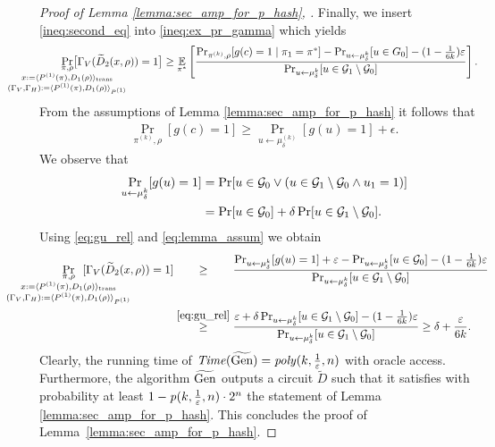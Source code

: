 \begin{proof}[Proof of Lemma \ref{lemma:sec_amp_for_p_hash}, \cite{holenstein2011general}]
Finally, we insert \eqref{ineq:second_eq} into \eqref{ineq:ex_pr_gamma} which yields
\begin{align*}
  \IndI
\underset{
  \mathclap{
  \substack{\pi, \rho \\ x := \langle P^{(1)}(\pi), D_1(\rho) \rangle_{\text{trans}}
    \\ (\Gamma_V, \Gamma_H) := \langle P^{(1)}(\pi), D_1 (\rho) \rangle_{P^{(1)}} }}}
{\Pr}\big[\Gamma_V(\widetilde{D}_2(x, \rho)) = 1\big]
&\geq \underset{\pi^*}{\mathbb{E}}\left[\frac{{\Pr}_{\pi^{(k)}, \rho}[g(c) = 1 \mid \pi_1 = \pi^*] -
{\Pr}_{u \leftarrow \mu_{\delta}^{k}}[u \in G_0] - (1 - \frac{1}{6k})\epsilon} {\Pr_{u \leftarrow \mu_{\delta}^{k}}[u \in \cG_1 \setminus \cG_0]}\right] \notag.
 \end{align*}
 From the assumptions of Lemma \ref{lemma:sec_amp_for_p_hash} it follows that
 \begin{align}
   \label{eq:lemma_assum}
   \Pr_{\pi^{(k)}, \rho} [g(c) = 1] \geq \Pr_{u \leftarrow \mu_{\delta}^{(k)}}[g(u) = 1] + \epsilon.
 \end{align}
We observe that
\begin{align}
  \label{eq:gu_rel}
\underset{u \leftarrow \mu_{\delta}^k}{\Pr}[g(u) = 1]
&= \Pr[u \in \mathcal{G}_0 \lor ( u \in \mathcal{G}_1 \setminus \mathcal{G}_0 \land u_1 = 1)] \notag\\
&= \Pr[u \in \mathcal{G}_0] + \delta \Pr[u \in \mathcal{G}_1 \setminus \mathcal{G}_0].
\end{align}
 Using \eqref{eq:gu_rel} and \eqref{eq:lemma_assum} we obtain
 \begin{align}
   \label{eq:proof_final}
   \IndI
\underset{
  \mathclap{
  \substack{\pi, \rho \\ x := \langle P^{(1)}(\pi), D_1(\rho) \rangle_{\text{trans}}
    \\ (\Gamma_V, \Gamma_H) := \langle P^{(1)}(\pi), D_1 (\rho) \rangle_{P^{(1)}} }}}
{\Pr}\mkern13mu[\Gamma_V(\widetilde{D}_2(x, \rho)) = 1]
 &\stackrel{\hphantom{\eqref{eq:gu_rel}}}{\geq} \frac{ {\Pr}_{u \leftarrow \mu_{\delta}^{k}}[g(u) = 1] + \epsilon -
 \Pr_{u \leftarrow \mu_{\delta}^{k}}[u \in \cG_0] - (1 - \frac{1}{6k})\epsilon} {\Pr_{u \leftarrow \mu_{\delta}^{k}}[u \in \cG_1 \setminus \cG_0]} \notag\\
 &\stackrel{\eqref{eq:gu_rel}}{\geq} \frac{\epsilon + \delta\Pr_{u \leftarrow \mu_{\delta}^{k}}[u \in \cG_1 \setminus \cG_0] - (1 - \frac{1}{6k})\epsilon}
{\Pr_{u \leftarrow \mu_{\delta}^{k}}[u \in \cG_1 \setminus \cG_0]} \geq \delta + \frac{\epsilon}{6k}.
\end{align}
Clearly, the running time of $\operatorname{\mathit{Time}}(\widetilde{\operatorname{\text{Gen}}}) = \operatorname{\mathit{poly}}(k, \frac{1}{\varepsilon}, n)$ with oracle access.
Furthermore, the algorithm $\widetilde{\operatorname{\text{Gen}}}$ outputs a circuit $\widetilde{D}$ such that it satisfies with probability at least $1 - \operatorname{\mathit{p}}(k, \frac{1}{\varepsilon}, n) \cdot 2^n$
the statement of Lemma \ref{lemma:sec_amp_for_p_hash}. This concludes the proof of Lemma~\ref{lemma:sec_amp_for_p_hash}.
\end{proof}
%
